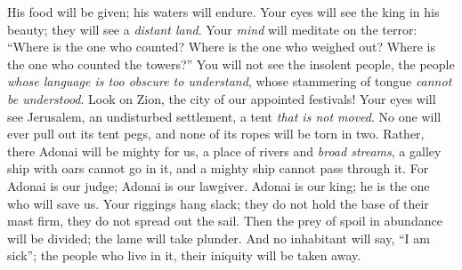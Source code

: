 \begin{biblechapter}
His food will be given; 
his waters will endure.
\verse Your eyes will see the king in his beauty; 
they will see a \textit{distant land}.
\verse Your \textit{mind} will meditate on the terror: 
“Where is the one who counted? 
Where is the one who weighed out? 
Where is the one who counted the towers?”
\verse You will not see the insolent people, 
the people \textit{whose language is too obscure to understand}, 
whose stammering of tongue \textit{cannot be understood}.
\verse Look on Zion, the city of our appointed festivals! 
Your eyes will see Jerusalem, 
an undisturbed settlement, 
a tent \textit{that is not moved}. 
No one will ever pull out its tent pegs, 
and none of its ropes will be torn in two.
\verse Rather, there Adonai will be mighty for us, 
a place of rivers and \textit{broad streams}, 
a galley ship with oars cannot go in it, 
and a mighty ship cannot pass through it.
\verse For Adonai is our judge; Adonai is our lawgiver. 
Adonai is our king; he is the one who will save us.
\verse Your riggings hang slack; 
they do not hold the base of their mast firm, 
they do not spread out the sail. 
Then the prey of spoil in abundance will be divided; 
the lame will take plunder.
\verse And no inhabitant will say, “I am sick”; 
the people who live in it, their iniquity will be taken away.
\end{biblechapter}

